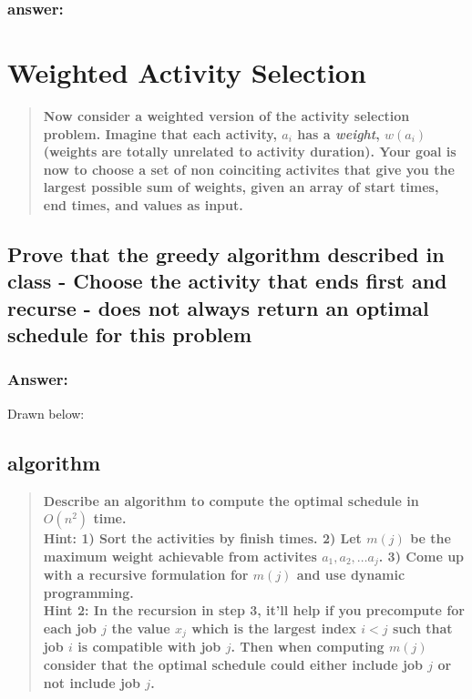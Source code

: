 \documentclass[titlepage]{article}\usepackage[]{graphicx}\usepackage[]{color}
\begin{document}
\subsubsection{answer:}
\vspace{9 cm}

\section{Weighted Activity Selection}
\begin{quote}
  \textbf{ Now consider a weighted version of the activity selection problem. Imagine
	that each activity, $a_i$ has a \textit{weight}, $w(a_i)$ (weights are
	totally unrelated to activity duration). Your goal is now to choose a set of
	non coinciting activites that give you the largest possible sum of weights,
  given an array of start times, end times, and values as input.}
\end{quote}

\subsection{Prove that the greedy algorithm described in class - Choose the
  activity that ends first and recurse - does not always return an optimal
schedule for this problem}
\subsubsection{Answer: }
Drawn below:
\vspace{7 cm}


\subsection{algorithm}
  
\begin{quote}
  
  \textbf{Describe an algorithm to compute the optimal schedule in $O(n^2)$
  time. \\
  Hint: 1) Sort the activities by finish times. 2) Let $m(j)$ be the
  maximum weight achievable from activites $a_1, a_2, \dots a_j$. 3) Come up
  with a recursive formulation for $m(j)$ and use dynamic programming. \\
  Hint 2:
  In the recursion in step 3, it'll help if you precompute for each job $j$ the
  value $x_j$ which is the largest index $i < j$ such that job $i$ is
  compatible with job $j$. Then when computing $m(j)$ consider that the optimal
schedule could either include job $j$ or not include job $j$.}
\end{quote}
\end{document}
